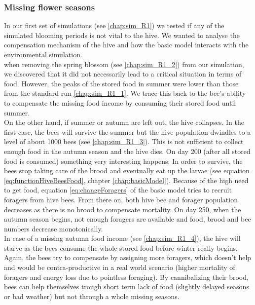 	\subsubsection{Missing flower seasons}
		\label{chap:missingFlowerSeasons}
		In our first set of simulations (see \ref{chap:sim_R1}) we tested if any of the simulated blooming periods is not vital to the hive. We wanted to analyse the compensation mechanism of the hive and how the basic model interacts with the environmental simulation.\\
		
		when removing the spring blossom (see \ref{chap:sim_R1_2}) from our simulation, we discovered that it did not necessarily lead to a critical situation in terms of food. However, the peaks of the stored food in summer were lower than those from the standard run \ref{chap:sim_R1_1}. We trace this back to the bee's ability to compensate the missing food income by consuming their stored food until summer.\\
		
		On the other hand, if summer or autumn are left out, the hive collapses. In the first case, the bees will survive the summer but the hive population dwindles to a level of about 1000 bees (see \ref{chap:sim_R1_3}). This is not sufficient to collect enough food in the autumn season and the hive dies. On day 200 (after all stored food is consumed) something very interesting happens: In order to survive, the bees stop taking care of the brood and eventually eat up the larvae (see equation \ref{eq:functionHiveBeesFood}, chapter \ref{chap:basicModel}). Because of the high need to get food, equation \ref{eq:changeForagers} of the basic model tries to recruit foragers from hive bees. From there on, both hive bee and forager population decreases as there is no brood to compensate mortality. On day 250, when the autumn season begins, not enough foragers are available and food, brood and bee numbers decrease monotonically.\\
		
		In case of a missing autumn food income (see \ref{chap:sim_R1_4}), the hive will starve as the bees consume the whole stored food before winter really begins. Again, the bees try to compensate by assigning more foragers, which doesn't help and would be contra-productive in a real world scenario (higher mortality of foragers and energy loss due to pointless foraging).
		By cannibalizing their brood, bees can help themselves trough short term lack of food (slightly delayed seasons or bad weather) but not through a whole missing seasons.
		
